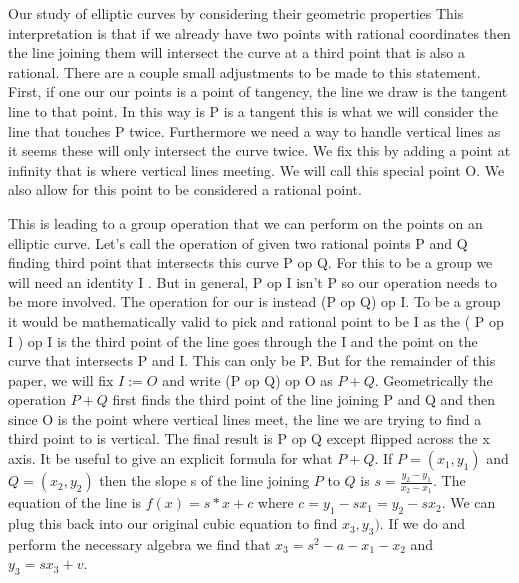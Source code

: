 \documentclass{article}
\begin{document}
Our study of elliptic curves by considering their geometric properties This interpretation is that if we already have two points with rational coordinates then the line joining them will intersect the curve at a third point that is also a rational. There are a couple small adjustments to be made to this statement. First, if one our our points is a point of tangency, the line we draw is the tangent line to that point. In this way is P is a tangent this is what we will consider the line that touches P twice. Furthermore we need a way to handle vertical lines as it seems these will only intersect the curve twice. We fix this by adding a point at infinity that is where vertical lines meeting. We will call this special point O. We also allow for this point to be considered a rational point.  

This is leading to a group operation that we can perform on the points on an elliptic curve. Let's call the operation of given two rational points P and Q finding third point that intersects this curve P op Q. For this to be a group we will need an identity I . But in general, P op I isn't P so our operation needs to be more involved. The operation for our is instead (P op Q) op I. To be a group it would be mathematically valid to pick and rational point to be I as the ( P op I ) op I is the third point of the line goes through the I and the point on the curve that intersects P and I. This can only be P. But for the remainder of this paper, we will fix $I := O$ and write (P op Q) op O as $P + Q$. Geometrically the operation $P + Q$ first finds the third point of the line joining P and Q and then since O is the point where vertical lines meet, the line we are trying to find a third point to is vertical. The final result is P op Q except flipped across the x axis. It be useful to give an explicit formula for what $P + Q$. If $P = (x_1, y_1)$ and $Q = (x_2, y_2)$ then the slope s of the line joining $P$ to $Q$ is $s = \frac{y_2 - y_1}{x_2 - x_1}$. The equation of the line is $f(x) = s *x + c$ where $c = y_1 - s x_1  = y_2 - s x_2$. We can plug this back into our original cubic equation to find $x_3, y_3)$. If we do and perform the necessary algebra we find that $x_3 = s^2 -a - x_1 - x_2$ and $y_3 = sx_3 + v$. 
\end{document}
